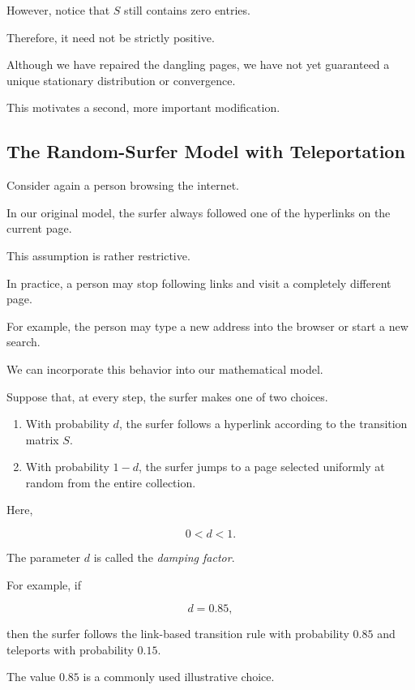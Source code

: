 \documentclass[11pt,a4paper]{article}
\theoremstyle{definition}
\theoremstyle{remark}
\begin{document}
However, notice that
$S$ still contains
zero entries.

Therefore, it need not
be strictly positive.

Although we have repaired
the dangling pages,
we have not yet guaranteed
a unique stationary
distribution or convergence.

This motivates a second,
more important modification.


\subsection{The Random-Surfer Model
with Teleportation}

Consider again a person
browsing the internet.

In our original model,
the surfer always followed
one of the hyperlinks
on the current page.

This assumption is
rather restrictive.

In practice, a person
may stop following links
and visit a completely
different page.

For example, the person
may type a new address
into the browser or
start a new search.

We can incorporate
this behavior into
our mathematical model.

Suppose that, at
every step, the surfer
makes one of two choices.

\begin{enumerate}

\item With probability
$d$, the surfer follows
a hyperlink according
to the transition
matrix $S$.

\item With probability
$1-d$, the surfer
jumps to a page
selected uniformly
at random from
the entire collection.

\end{enumerate}

Here,

\[
0<d<1.
\]

The parameter $d$
is called the
\emph{damping factor}.

For example, if

\[
d=0.85,
\]

then the surfer follows
the link-based transition
rule with probability
$0.85$ and teleports
with probability $0.15$.

The value $0.85$ is
a commonly used
illustrative choice.
\end{document}

